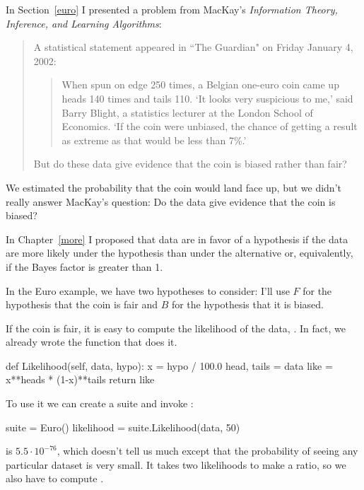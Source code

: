 \documentclass[12pt]{book}
\theoremstyle{exercise}
\begin{document}
In Section~\ref{euro} I presented a problem from MacKay's {\it Information
  Theory, Inference, and Learning Algorithms}:

\begin{quote}
A statistical statement appeared in ``The Guardian" on Friday January 4, 2002:

  \begin{quote}
        When spun on edge 250 times, a Belgian one-euro coin came
        up heads 140 times and tails 110.  `It looks very suspicious
        to me,' said Barry Blight, a statistics lecturer at the London
        School of Economics.  `If the coin were unbiased, the chance of
        getting a result as extreme as that would be less than 7\%.'
        \end{quote}

But do these data give evidence that the coin is biased rather than fair?
\end{quote}

We estimated the probability that the coin would
land face up, but we didn't really answer MacKay's question:
Do the data give evidence that the coin is biased?

In Chapter~\ref{more} I proposed that data are in favor of
a hypothesis if the data are more likely under the hypothesis than
under the alternative or, equivalently, if the Bayes factor is greater
than 1.

In the Euro example, we have two hypotheses to consider: I'll use
$F$ for the hypothesis that the coin is fair and $B$ for the hypothesis
that it is biased.

If the coin is fair, it is easy to compute the likelihood of the
data, .  In fact, we already wrote the function
that does it.

\begin{code}
    def Likelihood(self, data, hypo):
        x = hypo / 100.0
        head, tails = data
        like = x**heads * (1-x)**tails
        return like
\end{code}

To use it we can
create a  suite and invoke
:

\begin{code}
    suite = Euro()
    likelihood = suite.Likelihood(data, 50)
\end{code}

 is $5.5 \cdot 10^{-76}$, which doesn't tell us much except
that the probability of seeing any particular dataset is very small.
It takes two likelihoods to make a ratio, so we also have to
compute .
\end{document}
